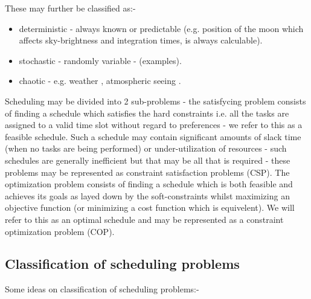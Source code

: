 \begin{itemize}
\begin{itemize}
These may further be classified as:-
\begin{itemize}
  \item deterministic - always known or predictable (e.g. position of the moon which affects sky-brightness and integration times, is always calculable).
  \item stochastic - randomly variable - (examples).
  \item chaotic - e.g. weather \cite{lorenz63npflow}, atmospheric seeing \cite{jorgenson91attractor}.
\end{itemize}
\end{itemize}

\end{itemize}

Scheduling may be divided into 2 sub-problems - the satisfycing problem consists of finding a schedule which satisfies the hard constraints i.e. all the tasks are assigned to a valid time slot without regard to preferences - we refer to this as a feasible schedule. Such a schedule may contain significant amounts of slack time (when no tasks are being performed) or under-utilization of resources - such schedules are generally inefficient but that may be all that is required - these problems may be represented as constraint satisfaction problems (CSP). The optimization problem consists of finding a schedule which is both feasible and achieves its goals as layed down by the soft-constraints whilst maximizing an objective function (or minimizing a cost function which is equivelent). We will refer to this as an optimal schedule and may be represented as a constraint optimization problem (COP). 

\subsection{Classification of scheduling problems}
Some ideas on classification of scheduling problems:-

